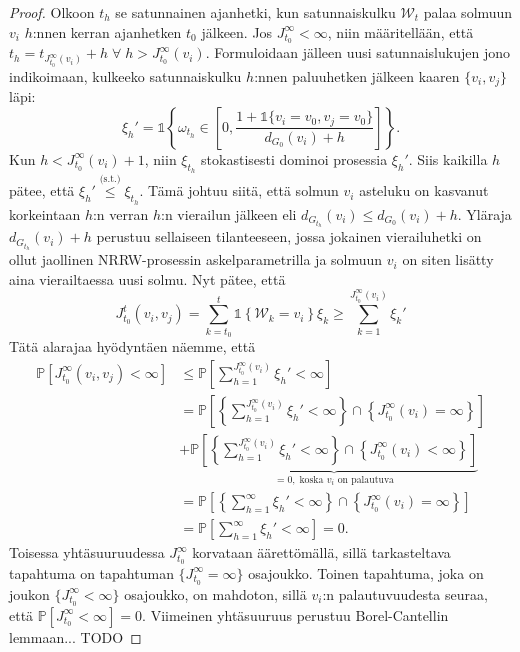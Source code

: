 \documentclass[finnish, 12pt, a4paper, sci, utf8, pdfa]{aaltothesis}
\newcommand{\Wrandom}{\mathcal{W}}
\newcommand{\indicator}{\mathopen{\mathds{1}}}
\newcommand*{\prob}{\mathbb{P}}
\begin{document}
\begin{proof}
   Olkoon $ t_{h} $ se satunnainen ajanhetki, kun satunnaiskulku $ \Wrandom_{t} $ palaa solmuun $ v_{i} $ $ h $:nnen kerran ajanhetken $ t_{0} $ jälkeen. Jos $ J_{t_{0}}^{\infty} < \infty $,
   niin määritellään, että $ t_{h} = t_{J_{t_{0}}^{\infty}(v_{i})} + h \; \forall \; h > J_{t_{0}}^{\infty}(v_{i}) $. Formuloidaan jälleen uusi satunnaislukujen jono indikoimaan, kulkeeko 
   satunnaiskulku $ h $:nnen paluuhetken jälkeen kaaren $ \{ v_{i}, v_{j} \} $ läpi:
   \[
      \xi_{h}' = \indicator \left\{ \omega_{t_{h}} \in \left[ 0, \frac{1 + \indicator \{ v_{i} = v_{0}, v_{j} = v_{0} \}}{d_{G_{0}}(v_{i}) + h} \right] \right\}.
   \]
   Kun $ h < J_{t_{0}}^{\infty}(v_{i}) + 1 $, niin $ \xi_{t_{h}} $ stokastisesti dominoi prosessia $ \xi_{h}' $. Siis kaikilla $ h $ pätee, että $ \xi_{h}' \overset{\text{(s.t.)}}{\leq} \xi_{t_{h}} $.
   Tämä johtuu siitä, että solmun $ v_{i} $ asteluku on kasvanut korkeintaan $ h $:n verran $ h $:n vierailun jälkeen eli $ d_{G_{t_{h}}}(v_{i}) \leq d_{G_{0}}(v_{i}) + h $. Yläraja
   $ d_{G_{t_{h}}}(v_{i}) + h $ perustuu sellaiseen tilanteeseen, jossa jokainen vierailuhetki on ollut jaollinen NRRW-prosessin askelparametrilla ja solmuun $ v_{i} $ on siten lisätty
   aina vierailtaessa uusi solmu. Nyt pätee, että
   \[
      J_{t_{0}}^{t}(v_{i}, v_{j}) = \sum_{k = t_{0}}^{t} \indicator \left\{ \Wrandom_{k} = v_{i} \right\} \xi_{k} \geq \sum_{k = 1}^{J_{t_{0}}^{\infty}(v_{i})} \xi_{k}'
   \]
   Tätä alarajaa hyödyntäen näemme, että
   \begin{align*}
      \prob \left[ J_{t_{0}}^{\infty}(v_{i}, v_{j}) < \infty \right] &\leq \prob \left[ \sum_{h = 1}^{J_{t_{0}}^{\infty}(v_{i})} \xi_{h}' < \infty \right] \\
         &= \prob \left[ \left\{ \sum_{h = 1}^{J_{t_{0}}^{\infty}(v_{i})} \xi_{h}' < \infty \right\} \cap \left\{ J_{t_{0}}^{\infty}(v_{i}) = \infty \right\} \right] \\
         &+ \underbrace{\prob \left[ \left\{ \sum_{h = 1}^{J_{t_{0}}^{\infty}(v_{i})} \xi_{h}' < \infty \right\} \cap \left\{ J_{t_{0}}^{\infty}(v_{i}) < \infty \right\} \right]}_{= 0, \; \text{koska } v_{i} \text{ on palautuva}} \\
         &= \prob \left[ \left\{ \sum_{h = 1}^{\infty} \xi_{h}' < \infty \right\} \cap \left\{ J_{t_{0}}^{\infty}(v_{i}) = \infty \right\} \right] \\
         &= \prob \left[ \sum_{h = 1}^{\infty} \xi_{h}' < \infty \right] = 0.
   \end{align*}
   Toisessa yhtäsuuruudessa $ J_{t_{0}}^{\infty} $ korvataan äärettömällä, sillä tarkasteltava tapahtuma on tapahtuman $ \{ J_{t_{0}}^{\infty} = \infty \} $ osajoukko. Toinen tapahtuma,
   joka on joukon $ \{ J_{t_{0}}^{\infty} < \infty \} $ osajoukko, on mahdoton, sillä $ v_{i} $:n palautuvuudesta seuraa, että $ \prob \left[ J_{t_{0}}^{\infty} < \infty \right] = 0. $
   Viimeinen yhtäsuuruus perustuu Borel-Cantellin lemmaan... TODO

\end{proof}
\end{document}
